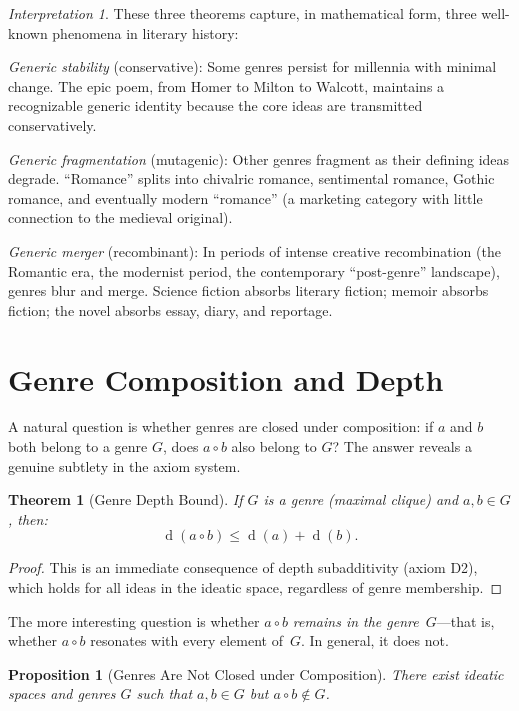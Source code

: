 \documentclass[11pt,openany]{book}
\theoremstyle{definition}
\theoremstyle{plain}
\newtheorem{theorem}[axiom]{Theorem}
\newtheorem{proposition}[axiom]{Proposition}
\theoremstyle{remark}
\newtheorem{interpretation}[axiom]{Interpretation}
\newcommand{\compose}{\circ}                 %
\newcommand{\depth}{\operatorname{d}}       %
\begin{document}
\begin{interpretation}
These three theorems capture, in mathematical form, three well-known phenomena in literary history:

\emph{Generic stability} (conservative): Some genres persist for millennia with minimal change. The epic poem, from Homer to Milton to Walcott, maintains a recognizable generic identity because the core ideas are transmitted conservatively.

\emph{Generic fragmentation} (mutagenic): Other genres fragment as their defining ideas degrade. ``Romance'' splits into chivalric romance, sentimental romance, Gothic romance, and eventually modern ``romance'' (a marketing category with little connection to the medieval original).

\emph{Generic merger} (recombinant): In periods of intense creative recombination (the Romantic era, the modernist period, the contemporary ``post-genre'' landscape), genres blur and merge. Science fiction absorbs literary fiction; memoir absorbs fiction; the novel absorbs essay, diary, and reportage.
\end{interpretation}

\section{Genre Composition and Depth}

A natural question is whether genres are closed under composition: if $a$ and $b$ both belong to a genre $G$, does $a \compose b$ also belong to $G$? The answer reveals a genuine subtlety in the axiom system.

\begin{theorem}[Genre Depth Bound]
If $G$ is a genre (maximal clique) and $a, b \in G$, then:
\[
\depth(a \compose b) \leq \depth(a) + \depth(b).
\]
\end{theorem}

\begin{proof}
This is an immediate consequence of depth subadditivity (axiom D2), which holds for all ideas in the ideatic space, regardless of genre membership.
\end{proof}

The more interesting question is whether $a \compose b$ \emph{remains in the genre}~$G$---that is, whether $a \compose b$ resonates with every element of~$G$. In general, it does not.

\begin{proposition}[Genres Are Not Closed under Composition]
There exist ideatic spaces and genres $G$ such that $a, b \in G$ but $a \compose b \notin G$.
\end{proposition}
\end{document}
